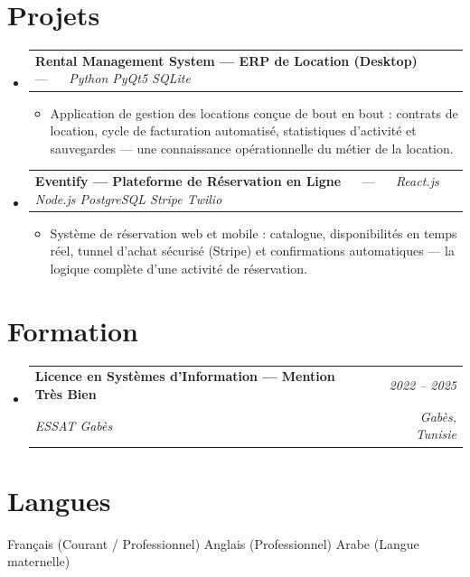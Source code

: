 \documentclass[letterpaper,9pt]{article}
\makeatletter
\newcommand{\resumeItem}[1]{\item\small{#1}}
\newcommand{\resumeSubheading}[4]{
  \vspace{-1pt}\item
  \begin{tabular*}{0.97\textwidth}[t]{l@{\extracolsep{\fill}}r}
    \textbf{#1} & \textit{\color{greytext}#2} \\
    \textit{\small\color{greytext} #3} & \textit{\small\color{greytext} #4}
  \end{tabular*}\vspace{-2pt}
}
\newcommand{\resumeProjectHeading}[2]{
  \item
  \begin{tabular*}{0.97\textwidth}{l@{\extracolsep{\fill}}r}
    \small #1 & #2
  \end{tabular*}\vspace{-1pt}
}
\newcommand{\resumeSubHeadingListStart}{\begin{itemize}[leftmargin=0.18in, label={}, itemsep=1.2pt, topsep=2.5pt, parsep=0pt]}
\newcommand{\resumeSubHeadingListEnd}{\end{itemize}\vspace{-2pt}}
\newcommand{\resumeProjectListStart}{\begin{itemize}[leftmargin=0.24in, label={}, itemsep=0.9pt, topsep=1.2pt, parsep=0pt]}
\newcommand{\resumeProjectListEnd}{\end{itemize}\vspace{-2pt}}
\makeatother
\begin{document}
\section{Projets}
\resumeSubHeadingListStart

  \resumeProjectHeading{\textbf{Rental Management System --- ERP de Location (Desktop)} $\quad$ --- $\quad$ \emph{\color{greytext}Python \textperiodcentered{} PyQt5 \textperiodcentered{} SQLite}}{}
    \resumeProjectListStart
      \resumeItem{Application de gestion des locations conçue de bout en bout : contrats de location, cycle de facturation automatisé, statistiques d'activité et sauvegardes — une connaissance opérationnelle du métier de la location.}
    \resumeProjectListEnd

  \resumeProjectHeading{\textbf{Eventify --- Plateforme de Réservation en Ligne} $\quad$ --- $\quad$ \emph{\color{greytext}React.js \textperiodcentered{} Node.js \textperiodcentered{} PostgreSQL \textperiodcentered{} Stripe \textperiodcentered{} Twilio}}{}
    \resumeProjectListStart
      \resumeItem{Système de réservation web et mobile : catalogue, disponibilités en temps réel, tunnel d'achat sécurisé (Stripe) et confirmations automatiques — la logique complète d'une activité de réservation.}
    \resumeProjectListEnd

\resumeSubHeadingListEnd\vspace{-3pt}

\section{Formation}
\resumeSubHeadingListStart
  \resumeSubheading{Licence en Systèmes d'Information --- Mention Très Bien}{2022 -- 2025}{ESSAT Gabès}{Gabès, Tunisie}
\resumeSubHeadingListEnd\vspace{-1pt}

\section{Langues}
\begin{itemize}[leftmargin=0.18in, label={}, topsep=2pt, itemsep=1pt, parsep=0pt]
\footnotesize{
  \item Français (Courant / Professionnel) \textperiodcentered{} Anglais (Professionnel) \textperiodcentered{} Arabe (Langue maternelle)
}
\end{itemize}
\end{document}
